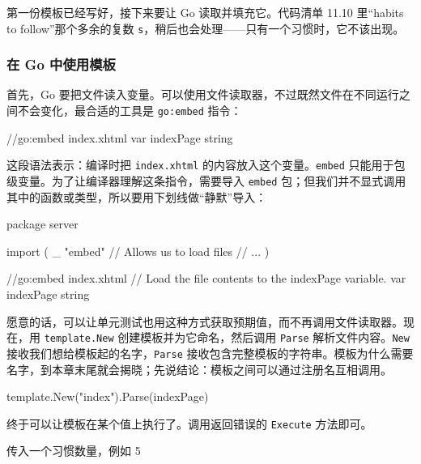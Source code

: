 第一份模板已经写好，接下来要让 Go 读取并填充它。代码清单 11.10 里“habits to follow”那个多余的复数 \texttt{s}，稍后也会处理——只有一个习惯时，它不该出现。

\subsubsection{在 Go 中使用模板}

首先，Go 要把文件读入变量。可以使用文件读取器，不过既然文件在不同运行之间不会变化，最合适的工具是 \texttt{go:embed} 指令：

\begin{gocode}[]
//go:embed index.xhtml
var indexPage string
\end{gocode}

这段语法表示：编译时把 \texttt{index.xhtml} 的内容放入这个变量。\texttt{embed} 只能用于包级变量。为了让编译器理解这条指令，需要导入 \texttt{embed} 包；但我们并不显式调用其中的函数或类型，所以要用下划线做“静默”导入：

\begin{gocode}[]
package server

import (
    _ "embed" // Allows us to load files
    // ...
)

//go:embed index.xhtml // Load the file contents to the indexPage variable.
var indexPage string
\end{gocode}

愿意的话，可以让单元测试也用这种方式获取预期值，而不再调用文件读取器。现在，用 \texttt{template.New} 创建模板并为它命名，然后调用 \texttt{Parse} 解析文件内容。\texttt{New} 接收我们想给模板起的名字，\texttt{Parse} 接收包含完整模板的字符串。模板为什么需要名字，到本章末尾就会揭晓；先说结论：模板之间可以通过注册名互相调用。

\begin{gocode}[]
template.New("index").Parse(indexPage)
\end{gocode}

终于可以让模板在某个值上执行了。调用返回错误的 \texttt{Execute} 方法即可。


\begin{codeannotations}
\item 传入一个习惯数量，例如 5
\end{codeannotations}

